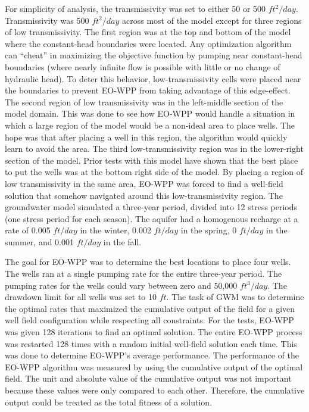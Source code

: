 \documentclass[authoryear]{elsarticle}
\begin{document}
For simplicity of analysis, the transmissivity was set to either 50 or 500 $ft^{2}/day$. Transmissivity was 500 $ft^{2}/day$ across most of the model except for three regions of low transmissivity. The first region was at the top and bottom of the model where the constant-head boundaries were located. Any optimization algorithm can “cheat” in maximizing the objective function by pumping near constant-head boundaries (where nearly infinite flow is possible with little or no change of hydraulic head). To deter this behavior, low-transmissivity cells were placed near the boundaries to prevent EO-WPP from taking advantage of this edge-effect. The second region of low transmissivity was in the left-middle section of the model domain. This was done to see how EO-WPP would handle a situation in which a large region of the model would be a non-ideal area to place wells. The hope was that after placing a well in this region, the algorithm would quickly learn to avoid the area. The third low-transmissivity region was in the lower-right section of the model. Prior tests with this model have shown that the best place to put the wells was at the bottom right side of the model. By placing a region of low transmissivity in the same area, EO-WPP was forced to find a well-field solution that somehow navigated around this low-transmissivity region. The groundwater model simulated a three-year period, divided into 12 stress periods (one stress period for each season). The aquifer had a homogenous recharge at a rate of 0.005 $ft/day$ in the winter, 0.002 $ft/day$ in the spring, 0 $ft/day$ in the summer, and 0.001 $ft/day$ in the fall.

The goal for EO-WPP was to determine the best locations to place four wells. The wells ran at a single pumping rate for the entire three-year period. The pumping rates for the wells could vary between zero and 50,000 $ft^3/day$. The drawdown limit for all wells was set to 10 $ft$. The task of GWM was to determine the optimal rates that maximized the cumulative output of the field for a given well field configuration while respecting all constraints. For the tests, EO-WPP was given 128 iterations to find an optimal solution. The entire EO-WPP process was restarted 128 times with a random initial well-field solution each time. This was done to determine EO-WPP’s average performance. The performance of the EO-WPP algorithm was measured by using the cumulative output of the optimal field. The unit and absolute value of the cumulative output was not important because these values were only compared to each other. Therefore, the cumulative output could be treated as the total fitness of a solution.
\end{document}
